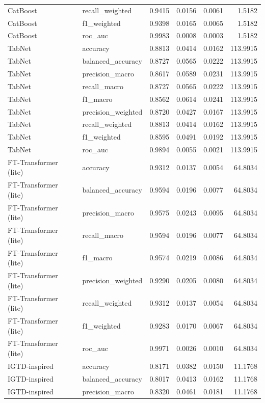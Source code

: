 \begin{tabular}{llrrrr}
CatBoost & recall_weighted & 0.9415 & 0.0156 & 0.0061 & 1.5182 \\
CatBoost & f1_weighted & 0.9398 & 0.0165 & 0.0065 & 1.5182 \\
CatBoost & roc_auc & 0.9983 & 0.0008 & 0.0003 & 1.5182 \\
TabNet & accuracy & 0.8813 & 0.0414 & 0.0162 & 113.9915 \\
TabNet & balanced_accuracy & 0.8727 & 0.0565 & 0.0222 & 113.9915 \\
TabNet & precision_macro & 0.8617 & 0.0589 & 0.0231 & 113.9915 \\
TabNet & recall_macro & 0.8727 & 0.0565 & 0.0222 & 113.9915 \\
TabNet & f1_macro & 0.8562 & 0.0614 & 0.0241 & 113.9915 \\
TabNet & precision_weighted & 0.8720 & 0.0427 & 0.0167 & 113.9915 \\
TabNet & recall_weighted & 0.8813 & 0.0414 & 0.0162 & 113.9915 \\
TabNet & f1_weighted & 0.8595 & 0.0491 & 0.0192 & 113.9915 \\
TabNet & roc_auc & 0.9894 & 0.0055 & 0.0021 & 113.9915 \\
FT-Transformer (lite) & accuracy & 0.9312 & 0.0137 & 0.0054 & 64.8034 \\
FT-Transformer (lite) & balanced_accuracy & 0.9594 & 0.0196 & 0.0077 & 64.8034 \\
FT-Transformer (lite) & precision_macro & 0.9575 & 0.0243 & 0.0095 & 64.8034 \\
FT-Transformer (lite) & recall_macro & 0.9594 & 0.0196 & 0.0077 & 64.8034 \\
FT-Transformer (lite) & f1_macro & 0.9574 & 0.0219 & 0.0086 & 64.8034 \\
FT-Transformer (lite) & precision_weighted & 0.9290 & 0.0205 & 0.0080 & 64.8034 \\
FT-Transformer (lite) & recall_weighted & 0.9312 & 0.0137 & 0.0054 & 64.8034 \\
FT-Transformer (lite) & f1_weighted & 0.9283 & 0.0170 & 0.0067 & 64.8034 \\
FT-Transformer (lite) & roc_auc & 0.9971 & 0.0026 & 0.0010 & 64.8034 \\
IGTD-inspired & accuracy & 0.8171 & 0.0382 & 0.0150 & 11.1768 \\
IGTD-inspired & balanced_accuracy & 0.8017 & 0.0413 & 0.0162 & 11.1768 \\
IGTD-inspired & precision_macro & 0.8320 & 0.0461 & 0.0181 & 11.1768 \\

\end{tabular}
